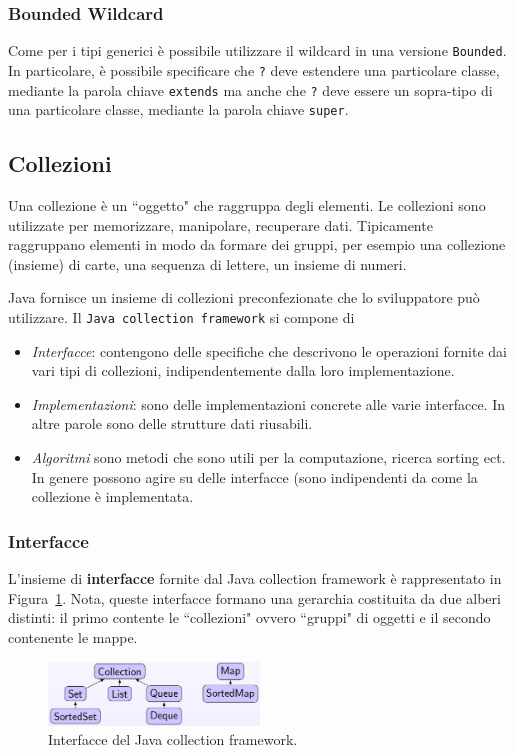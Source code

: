 \documentclass{article}
\begin{document}
\subsubsection{Bounded Wildcard}
Come per i tipi generici \`e possibile utilizzare il wildcard in una versione \texttt{Bounded}. In particolare, \`e possibile specificare che \texttt{?} deve estendere una particolare classe, mediante la parola chiave \texttt{extends} ma anche che \texttt{?} deve essere un sopra-tipo di una particolare classe, mediante la parola chiave \texttt{super}.

\subsection{Collezioni}
Una collezione \`e un ``oggetto" che raggruppa degli elementi. Le collezioni sono utilizzate per memorizzare, manipolare, recuperare dati. Tipicamente raggruppano elementi in modo da formare dei gruppi, per esempio una collezione (insieme) di carte, una sequenza di lettere, un insieme di numeri. 

Java fornisce un insieme di collezioni preconfezionate che lo sviluppatore pu\`o utilizzare. Il \texttt{Java collection framework} si compone di 
\begin{itemize}
\item \emph{Interfacce}: contengono delle specifiche che descrivono le operazioni fornite dai vari tipi di collezioni, indipendentemente dalla loro implementazione. 
\item \emph{Implementazioni}: sono delle implementazioni concrete alle varie interfacce. In altre parole sono delle strutture dati riusabili.
\item \emph{Algoritmi} sono metodi che sono utili per la computazione, ricerca sorting ect. In genere possono agire su delle interfacce (sono indipendenti da come la collezione \`e implementata. 
\end{itemize}

\subsubsection{Interfacce}
L'insieme di \textbf{interfacce} fornite dal Java collection framework \`e rappresentato in Figura~\ref{Fig:collections}. Nota, queste interfacce formano una gerarchia costituita da due alberi distinti: il primo contente le ``collezioni" ovvero ``gruppi" di oggetti e il secondo contenente le mappe.

\begin{figure}[h!]
  \centering
    \includegraphics[width=0.5\textwidth]{colls-coreInterfaces.png}
  \caption{Interfacce del  Java collection framework.}
    \label{Fig:collections}
\end{figure}
\end{document}
